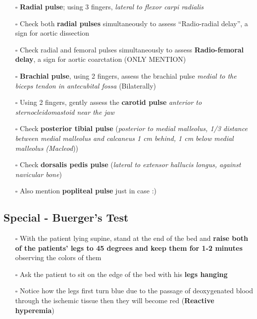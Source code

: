 \documentclass[
  13.5pt,
  a4paper,
  DIV=11,
  numbers=noendperiod]{scrreprt}
\providecommand{\tightlist}{%
  \setlength{\itemsep}{0pt}\setlength{\parskip}{0pt}}
\begin{document}
\begin{itemize}
\tightlist
\item[$\square$]
  \textbf{Radial pulse}; using 3 fingers, \emph{lateral to flexor carpi
  radialis}\\
\item[$\square$]
  Check both \textbf{radial pulses} simultaneously to assess
  ``Radio-radial delay'', a sign for aortic dissection\\
\item[$\square$]
  Check radial and femoral pulses simultaneously to assess
  \textbf{Radio-femoral delay}, a sign for aortic coarctation (ONLY
  MENTION)\\
\item[$\square$]
  \textbf{Brachial pulse}, using 2 fingers, assess the brachial pulse
  \emph{medial to the biceps tendon in antecubital fossa}
  (Bilaterally)\\
\item[$\square$]
  Using 2 fingers, gently assess the \textbf{carotid pulse}
  \emph{anterior to sternocleidomastoid near the jaw}\\
\item[$\square$]
  Check \textbf{posterior tibial pulse} (\emph{posterior to medial
  malleolus, 1/3 distance between medial malleolus and calcaneus
  \textbar{} 1 cm behind, 1 cm below medial malleolus (Macleod}))\\
\item[$\square$]
  Check \textbf{dorsalis pedis pulse} (\emph{lateral to extensor
  hallucis longus, against navicular bone})\\
\item[$\square$]
  Also mention \textbf{popliteal pulse} just in case :)
\end{itemize}

\subsection{Special - Buerger's Test}\label{special---buergers-test}

\begin{itemize}
\tightlist
\item[$\square$]
  With the patient lying supine, stand at the end of the bed and
  \textbf{raise both of the patients' legs to 45 degrees and keep them
  for 1-2 minutes} observing the colors of them\\
\item[$\square$]
  Ask the patient to sit on the edge of the bed with his \textbf{legs
  hanging}\\
\item[$\square$]
  Notice how the legs first turn blue due to the passage of deoxygenated
  blood through the ischemic tissue then they will become red
  (\textbf{Reactive hyperemia})
\end{itemize}
\end{document}
